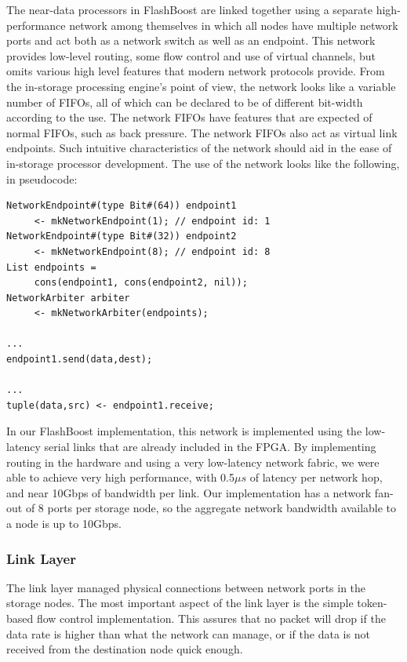 The near-data processors in FlashBoost are linked together using a separate
high-performance network among themselves in which all nodes have multiple
network ports and act both as a network switch as well as an endpoint. This network provides low-level
routing, some flow control and use of virtual channels, but omits various high level
features that modern network protocols provide. From the in-storage processing
engine's point of view, the network looks like a variable number of FIFOs, all
of which can be declared to be of different bit-width according to the use. The
network FIFOs have features that are expected of normal FIFOs, such as back
pressure. The network FIFOs also act as virtual link endpoints. Such intuitive characteristics of the network should aid in the ease
of in-storage processor development. The use of the network looks like the following, in pseudocode:

\begin{verbatim}
NetworkEndpoint#(type Bit#(64)) endpoint1 
     <- mkNetworkEndpoint(1); // endpoint id: 1
NetworkEndpoint#(type Bit#(32)) endpoint2 
     <- mkNetworkEndpoint(8); // endpoint id: 8
List endpoints = 
     cons(endpoint1, cons(endpoint2, nil));
NetworkArbiter arbiter 
     <- mkNetworkArbiter(endpoints);

...
endpoint1.send(data,dest);

...
tuple(data,src) <- endpoint1.receive;
\end{verbatim}

In our FlashBoost implementation, this network is implemented using the
low-latency serial links that are already included in the FPGA. By implementing
routing in the hardware and using a very low-latency network fabric, we were
able to achieve very high performance, with 0.5$\mu s$ of latency per network
hop, and near 10Gbps of bandwidth per link. Our implementation has a network
fan-out of 8 ports per storage node, so the aggregate network bandwidth
available to a node is up to 10Gbps.

\subsubsection{Link Layer}

The link layer managed physical connections between network ports in the storage
nodes. The most important aspect of the link layer is the simple token-based
flow control implementation. This assures that no packet will drop if the data
rate is higher than what the network can manage, or if the data is not received
from the destination node quick enough.

